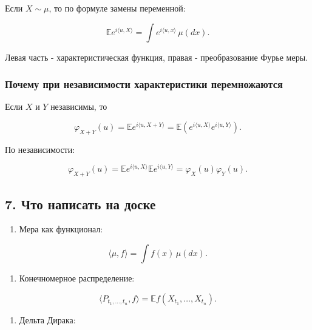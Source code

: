 \documentclass[
  11pt,
  a4paper,
]{article}
\providecommand{\tightlist}{%
  \setlength{\itemsep}{0pt}\setlength{\parskip}{0pt}}
\begin{document}
Если \(X\sim\mu\), то по формуле замены переменной:

\[
\mathbb E e^{i\langle u,X\rangle}
=
\int e^{i\langle u,x\rangle}\,\mu(dx).
\]

Левая часть - характеристическая функция, правая - преобразование Фурье
меры.

\subsubsection{Почему при независимости характеристики
перемножаются}\label{ux43fux43eux447ux435ux43cux443-ux43fux440ux438-ux43dux435ux437ux430ux432ux438ux441ux438ux43cux43eux441ux442ux438-ux445ux430ux440ux430ux43aux442ux435ux440ux438ux441ux442ux438ux43aux438-ux43fux435ux440ux435ux43cux43dux43eux436ux430ux44eux442ux441ux44f}

Если \(X\) и \(Y\) независимы, то

\[
\varphi_{X+Y}(u)
=
\mathbb E e^{i\langle u,X+Y\rangle}
=
\mathbb E\left(e^{i\langle u,X\rangle}e^{i\langle u,Y\rangle}\right).
\]

По независимости:

\[
\varphi_{X+Y}(u)
=
\mathbb E e^{i\langle u,X\rangle}
\mathbb E e^{i\langle u,Y\rangle}
=
\varphi_X(u)\varphi_Y(u).
\]

\subsection{7. Что написать на
доске}\label{ux447ux442ux43e-ux43dux430ux43fux438ux441ux430ux442ux44c-ux43dux430-ux434ux43eux441ux43aux435}

\begin{enumerate}
\def\labelenumi{\arabic{enumi}.}
\tightlist
\item
  Мера как функционал:
\end{enumerate}

\[
\langle\mu,f\rangle=\int f(x)\,\mu(dx).
\]

\begin{enumerate}
\def\labelenumi{\arabic{enumi}.}
\setcounter{enumi}{1}
\tightlist
\item
  Конечномерное распределение:
\end{enumerate}

\[
\langle P_{t_1,\ldots,t_n},f\rangle
=
\mathbb E f(X_{t_1},\ldots,X_{t_n}).
\]

\begin{enumerate}
\def\labelenumi{\arabic{enumi}.}
\setcounter{enumi}{2}
\tightlist
\item
  Дельта Дирака:
\end{enumerate}
\end{document}
